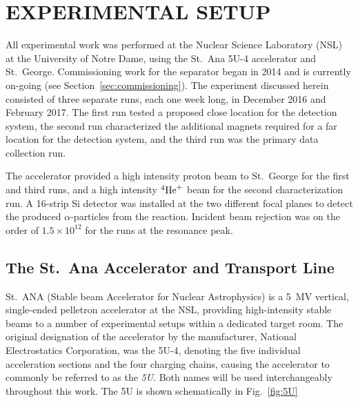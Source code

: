 
\chapter{EXPERIMENTAL SETUP}
\label{ch:02-experimental-setup}

All experimental work was performed at the Nuclear Science Laboratory
(NSL) at the University of Notre Dame, using the St.\ Ana 5U-4
accelerator and St.\ George. Commissioning work for the separator began
in 2014 and is currently on-going (see Section~\ref{sec:commissioning}).
The experiment discussed herein consisted of three separate runs, each
one week long, in December 2016 and February 2017. The first run tested
a proposed close location for the detection system, the second run
characterized the additional magnets required for a far location for the
detection system, and the third run was the primary data collection run.

The accelerator provided a high intensity proton beam to St.\ George for
the first and third runs, and a high intensity ${}^{4}\textrm{He}^{+}$ beam
for the second characterization run. A 16-strip Si detector was
installed at the two different focal planes to detect the produced $\alpha$-particles from
the \alpa{} reaction. Incident beam rejection was on the order of
$1.5\times 10^{12}$ for the runs at the resonance peak.


\section{The St.\ Ana Accelerator and Transport Line}
\label{sec:ch02-5U}

St.\ ANA (Stable beam Accelerator for Nuclear Astrophysics) is a 5~MV
vertical, single-ended pelletron accelerator at the NSL, providing
high-intensity stable beams to a number of experimental setups within a
dedicated target room. The original designation of the accelerator by
the manufacturer, National Electrostatics Corporation, was the 5U-4,
denoting the five individual acceleration sections and the four charging
chains, causing the accelerator to commonly be referred to as the
\textit{5U}. Both names will be used interchangeably throughout this
work. The 5U is shown schematically in Fig.~\ref{fig:5U}

